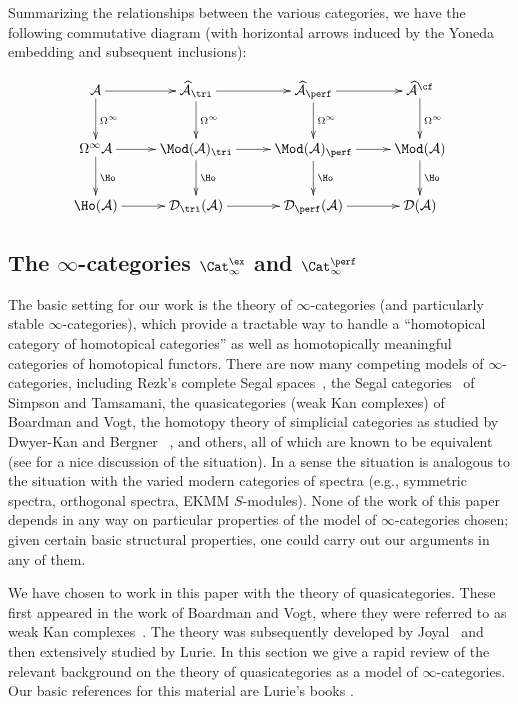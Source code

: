 \documentclass{amsart}
\let\catsymbfont\mathcal
\newcommand{\aA}{{\catsymbfont{A}}}
\newcommand{\aD}{{\catsymbfont{D}}}
\newcommand{\stabcat}{\Cat_\i^{\ex}}
\newcommand{\idemstabcat}{\Cat_\i^{\perf}}
\renewcommand{\i}{\infty}
\numberwithin{equation}{section}
\theoremstyle{definition}
\begin{document}
Summarizing the relationships between the various categories, we have
the following commutative diagram (with horizontal arrows induced by
the Yoneda embedding and subsequent inclusions):

\[
\xymatrix{
\aA \ar[r] \ar[d]^{\Omega^\i} & \widehat{\aA}_{\tri} \ar[r] \ar[d]^{\Omega^\i} &
\widehat{\aA}_{\perf} \ar[r]\ar[d]^{\Omega^\i} & \widehat{\aA}^{\cf} \ar[d]^{\Omega^\i} \\
\Omega^\i\aA \ar[r] \ar[d]^{\Ho} & \Mod(\aA)_{\tri} \ar[r] \ar[d]^{\Ho} &
\Mod(\aA)_{\perf} \ar[r]\ar[d]^{\Ho} & \Mod(\aA) \ar[d]^{\Ho} \\
\Ho(\aA) \ar[r] & \aD_{\tri}(\aA) \ar[r] & \aD_{\perf}(\aA) \ar[r] & \aD(\aA) \\
}
\]

\subsection{The $\i$-categories $\stabcat$ and
$\idemstabcat$}\label{sub:categories}

The basic setting for our work is the theory of $\i$-categories (and
particularly stable $\i$-categories), which provide a tractable way to
handle a ``homotopical category of homotopical categories'' as well as
homotopically meaningful categories of homotopical functors.  There
are now many competing models of $\i$-categories, including Rezk's
complete Segal spaces~\cite{Rezk}, the Segal
categories~\cite{HirschowitzSimpson, Tamsamani} of Simpson and
Tamsamani, the quasicategories (weak Kan complexes) of Boardman
and Vogt, the homotopy theory of simplicial categories as studied by
Dwyer-Kan and Bergner ~\cite{DwyerKan, Bergner}, and others, all of
which are known to be equivalent (see \cite{BergnerCompare} for a nice
discussion of the situation).  In a sense the situation is analogous
to the situation with the varied modern categories of spectra (e.g.,
symmetric spectra, orthogonal spectra, EKMM $S$-modules).  None of the
work of this paper depends in any way on particular properties of the
model of $\i$-categories chosen; given certain basic structural
properties, one could carry out our arguments in any of them.

We have chosen to work in this paper with the theory of
quasicategories.  These first appeared in the work of Boardman and
Vogt, where they were referred to as weak Kan
complexes~\cite{BoardmanVogt}.  The theory was subsequently developed
by Joyal~\cite{Joyal} and then extensively studied by Lurie.  In this
section we give a rapid review of the relevant background on the
theory of quasicategories as a model of $\i$-categories.  Our basic
references for this material are Lurie's books \cite{HTT, HAG}. 
\end{document}
